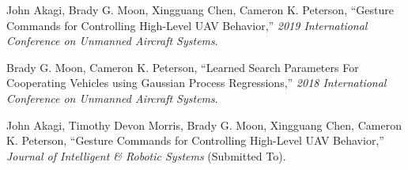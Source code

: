 

\begin{cvparagraph}
John Akagi, Brady G. Moon, Xingguang Chen, Cameron K. Peterson, ``Gesture Commands for Controlling High-Level UAV Behavior,'' \textit{2019 International Conference on Unmanned Aircraft Systems}.
\end{cvparagraph}

\begin{cvparagraph}
 Brady G. Moon, Cameron K. Peterson, ``Learned Search Parameters For Cooperating Vehicles using Gaussian Process Regressions,'' \textit{2018 International Conference on Unmanned Aircraft Systems}.
\end{cvparagraph}

\begin{cvparagraph}
 John Akagi, Timothy Devon Morris, Brady G. Moon, Xingguang Chen, Cameron K. Peterson, ``Gesture Commands for Controlling High-Level UAV Behavior,'' \textit{Journal of Intelligent \& Robotic Systems} (Submitted To).
\end{cvparagraph}


